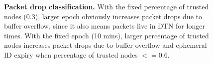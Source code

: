 \documentclass[11pt]{article}
\begin{document}
\begin{figure}[h!]
\center
{}
\hfill
{}
\caption{{\bf Packet drop classification.}
With the fixed percentage of trusted nodes (0.3), larger epoch obviously increases packet drops due to buffer overflow, since it also means packets live in DTN for longer times.
With the fixed epoch (10 mins), larger percentage of trusted nodes increases packet drops due to buffer overflow and ephemeral ID expiry when percentage of trusted nodes $<=0.6$.
}
\label{fig:drop_classification}
\end{figure}
\end{document}
